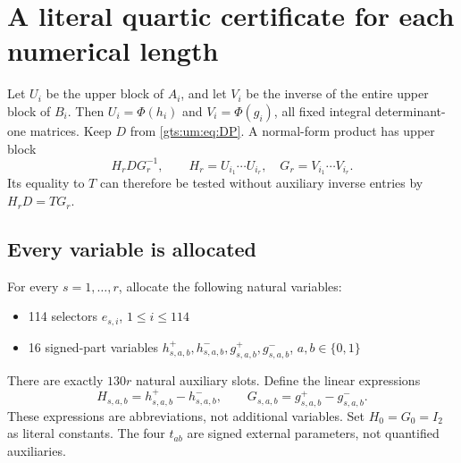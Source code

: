 \documentclass[11pt,letterpaper]{article}
\theoremstyle{definition}
\theoremstyle{remark}
\begin{document}
\section{A literal quartic certificate for each numerical length}
\label{gts:um:sec:polynomial}
Let $U_i$ be the upper block of $A_i$, and let $V_i$ be the inverse of the entire upper block of $B_i$. Then $U_i=\Phi(h_i)$ and $V_i=\Phi(g_i)$, all fixed integral determinant-one matrices. Keep $D$ from \eqref{gts:um:eq:DP}. A normal-form product has upper block
\[
 H_r D G_r^{-1},\qquad H_r=U_{i_1}\cdots U_{i_r},\quad
 G_r=V_{i_1}\cdots V_{i_r}.
\]
Its equality to $T$ can therefore be tested without auxiliary inverse entries by $H_rD=TG_r$.

\subsection{Every variable is allocated}
For every $s=1,\ldots,r$, allocate the following natural variables:
\begin{itemize}
\item 114 selectors $e_{s,i}$, $1\leq i\leq114$
\item 16 signed-part variables $h^+_{s,a,b},h^-_{s,a,b},g^+_{s,a,b},g^-_{s,a,b}$, $a,b\in\{0,1\}$
\end{itemize}
There are exactly $130r$ natural auxiliary slots. Define the linear expressions
\[
 H_{s,a,b}=h^+_{s,a,b}-h^-_{s,a,b},\qquad
 G_{s,a,b}=g^+_{s,a,b}-g^-_{s,a,b}.
\]
These expressions are abbreviations, not additional variables. Set $H_0=G_0=I_2$ as literal constants. The four $t_{ab}$ are signed external parameters, not quantified auxiliaries.
\end{document}
